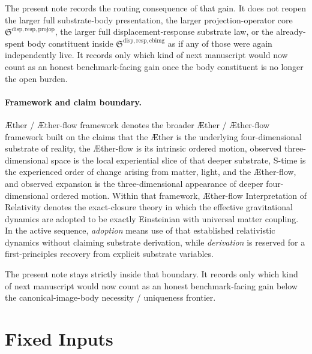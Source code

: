 \documentclass[11pt]{article}
\newcommand{\Aether}{\AE{}ther}
\newcommand{\Aflow}{\AE{}ther-flow}
\newcommand{\TheoryName}{\Aflow{} Interpretation of Relativity}
\newcommand{\TheoryProgram}{\Aether{} / \Aflow{} framework}
\newcommand{\ProjectionOperatorCore}{\mathfrak S^{\mathrm{disp,resp,projop}}}
\newcommand{\CurrentBodyImageCore}{\mathfrak S^{\mathrm{disp,resp,cbimg}}}
\begin{document}
The present note records the routing consequence of that gain. It does not reopen the larger full substrate-body presentation, the larger projection-operator core \(\ProjectionOperatorCore\), the larger full displacement-response substrate law, or the already-spent body constituent inside \(\CurrentBodyImageCore\) as if any of those were again independently live. It records only which kind of next manuscript would now count as an honest benchmark-facing gain once the body constituent is no longer the open burden.

\paragraph{Framework and claim boundary.}
\TheoryProgram{} denotes the broader \Aether{} / \Aflow{} framework built on the claims that the \Aether{} is the underlying four-dimensional substrate of reality, the \Aflow{} is its intrinsic ordered motion, observed three-dimensional space is the local experiential slice of that deeper substrate, S-time is the experienced order of change arising from matter, light, and the \Aflow{}, and observed expansion is the three-dimensional appearance of deeper four-dimensional ordered motion. Within that framework, \TheoryName{} denotes the exact-closure theory in which the effective gravitational dynamics are adopted to be exactly Einsteinian with universal matter coupling. In the active sequence, \emph{adoption} means use of that established relativistic dynamics without claiming substrate derivation, while \emph{derivation} is reserved for a first-principles recovery from explicit substrate variables.

The present note stays strictly inside that boundary. It records only which kind of next manuscript would now count as an honest benchmark-facing gain below the canonical-image-body necessity / uniqueness frontier.

\section{Fixed Inputs}
\end{document}
